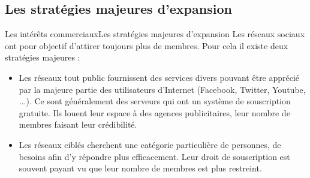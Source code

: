 \documentclass{beamer}
\begin{document}
\subsection{Les stratégies majeures d'expansion}
\begin{frame}{Les intérêts commerciaux}{Les stratégies majeures d'expansion}
Les réseaux sociaux ont pour objectif d'attirer toujours plus de membres. Pour cela il existe deux stratégies majeures : 
	\begin{itemize}
		\item Les réseaux tout public fournissent des services divers pouvant être apprécié par la majeure partie des utilisateurs d'Internet (Facebook, Twitter, Youtube, ...). Ce sont généralement des serveurs qui ont un système de souscription gratuite. Ils louent leur espace à des agences publicitaires, leur nombre de membres faisant leur crédibilité.
		\item Les réseaux ciblés cherchent une catégorie particulière de personnes, de besoins afin d'y répondre plus efficacement. Leur droit de souscription est souvent payant vu que leur nombre de membres est plus restreint.
	\end{itemize}
\end{frame}
\end{document}
